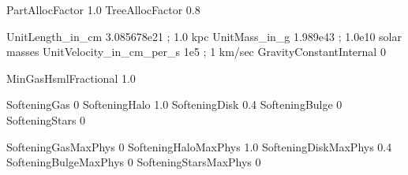 
PartAllocFactor       1.0
TreeAllocFactor       0.8




UnitLength_in_cm         3.085678e21        ;  1.0 kpc 
UnitMass_in_g            1.989e43           ;  1.0e10 solar masses 
UnitVelocity_in_cm_per_s 1e5                ;  1 km/sec 
GravityConstantInternal  0
 


MinGasHsmlFractional 1.0

SofteningGas       0
SofteningHalo      1.0
SofteningDisk      0.4
SofteningBulge     0           
SofteningStars     0

SofteningGasMaxPhys       0
SofteningHaloMaxPhys      1.0
SofteningDiskMaxPhys      0.4
SofteningBulgeMaxPhys     0           
SofteningStarsMaxPhys     0






























